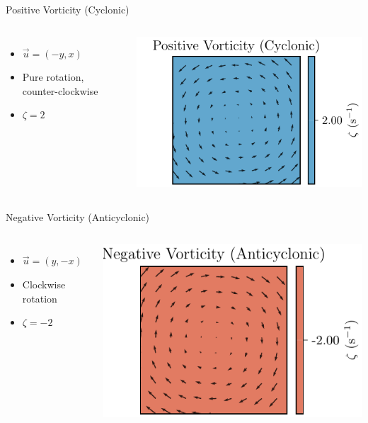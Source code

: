     \begin{frame}{Positive Vorticity (Cyclonic)}
    \begin{columns}
      \begin{itemize}
        \item \( \vec{u} = (-y, x) \)
        \item Pure rotation, counter-clockwise
        \item \( \zeta = 2 \)
      \end{itemize}
    
      \includegraphics[width=\linewidth]{../images/vorticity_plot3.pdf}
    \end{columns}
    \end{frame}
    
    \begin{frame}{Negative Vorticity (Anticyclonic)}
    \begin{columns}
      \begin{itemize}
        \item \( \vec{u} = (y, -x) \)
        \item Clockwise rotation
        \item \( \zeta = -2 \)
      \end{itemize}
    
      \includegraphics[width=\linewidth]{../images/vorticity_plot4.pdf}
    \end{columns}
    \end{frame}

